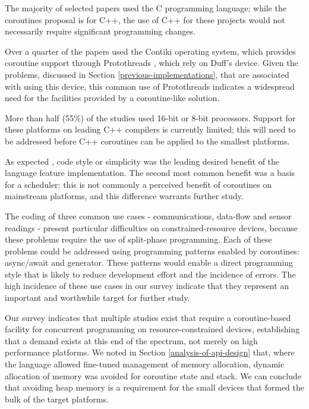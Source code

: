 \documentclass[format=acmsmall, review=false, screen=false]{acmart}
\begin{document}

The majority of selected papers used the C programming language; while the coroutines proposal \cite{ISO2017} is for C++, the use of C++ for these projects would not necessarily require significant programming changes.

Over a quarter of the papers used the Contiki \cite{Dunkels2004} operating system, which provides coroutine support through Protothreads \cite{Dunkels2006}, which rely on Duff’s device. Given the problems, discussed in Section \ref{previous-implementations}, that are associated with using this device, this common use of Protothreads indicates a widespread need for the facilities provided by a coroutine-like solution.

More than half (55\%) of the studies used 16-bit or 8-bit processors. Support for these platforms on leading C++ compilers is currently limited; this will need to be addressed before C++ coroutines can be applied to the smallest platforms.

As expected \cite{AspenCore2017, Skerrett2017}, code style or simplicity was the leading desired benefit of the language feature implementation. The second most common benefit was a basis for a scheduler: this is not commonly a perceived benefit of coroutines on mainstream platforms, and this difference warrants further study.

The coding of three common use cases - communications, data-flow and sensor readings - present particular difficulties on constrained-resource devices, because these problems require the use of split-phase programming. Each of these problems could be addressed using programming patterns enabled by coroutines: async/await and generator. These patterns would enable a direct programming style that is likely to reduce development effort and the incidence of errors. The high incidence of these use cases in our survey indicate that they represent an important and worthwhile target for further study.

Our survey indicates that multiple studies exist that require a coroutine-based facility for concurrent programming on resource-constrained devices, establishing that a demand exists at this end of the spectrum, not merely on high performance platforms. We noted in Section \ref{analysis-of-api-design} that, where the language allowed fine-tuned management of memory allocation, dynamic allocation of memory was avoided for coroutine state and stack. We can conclude that avoiding heap memory is a requirement for the small devices that formed the bulk of the target platforms.
\end{document}
